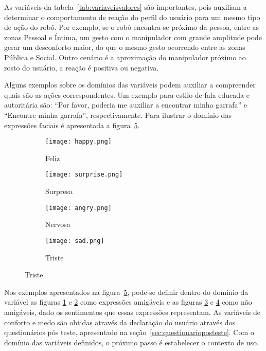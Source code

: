 As variáveis da tabela~\ref{tab:variaveisvalores} são importantes, pois auxiliam a determinar o comportamento de reação do perfil do usuário para um mesmo tipo de ação do robô. Por exemplo, se o robô encontra-se próximo da pessoa, entre as zonas Pessoal e Íntima, um gesto com o manipulador com grande amplitude pode gerar um desconforto maior, do que o mesmo gesto ocorrendo entre as zonas Pública e Social. Outro cenário é a aproximação do manipulador próximo ao rosto do usuário, a reação é positiva ou negativa.

Alguns exemplos sobre os domínios das variáveis podem auxiliar a compreender quais são as ações correspondentes. Um exemplo para estilo de fala educada e autoritária são: ``Por favor, poderia me auxiliar a encontrar minha garrafa'' e ``Encontre minha garrafa'', respectivamente. Para ilustrar o domínio das expressões faciais é apresentada a figura~\ref{fig:dominioexpressoesfaciais}.

\begin{figure}[ht!]
	\centering
	\begin{minipage}{\textwidth}
		\caption{Exemplos das faces apresentadas pelo robô.}
		\begin{subfigure}[b]{0.48\textwidth}
			\texttt{[image: happy.png]}
	        \caption{Feliz}
	        \label{fig:feliz}
	    \end{subfigure}
	    \hfill
		\begin{subfigure}[b]{0.48\textwidth}
	        \texttt{[image: surprise.png]}
	        \caption{Surpresa}
	        \label{fig:surpresa}
	    \end{subfigure}

		\begin{subfigure}[b]{0.48\textwidth}
	        \texttt{[image: angry.png]}
	        \caption{Nervosa}
	        \label{fig:nervosa}
    	\end{subfigure}
		\hfill
		\begin{subfigure}[b]{0.48\textwidth}
	        \texttt{[image: sad.png]}
	        \caption{Triste}
	        \label{fig:triste}
    	\end{subfigure}
		\label{fig:dominioexpressoesfaciais}
	\end{minipage}
\end{figure}

Nos exemplos apresentados na figura~\ref{fig:dominioexpressoesfaciais}, pode-se definir dentro do domínio da variável as figuras \ref{fig:feliz} e \ref{fig:surpresa} como expressões amigáveis e as figuras \ref{fig:nervosa} e \ref{fig:triste} como não amigáveis, dado os sentimentos que essas expressões representam. As variáveis de conforto e medo são obtidas através da declaração do usuário através dos questionários pós teste, apresentado na seção~\ref{sec:questionarioposteste}. Com o domínio das variáveis definidos, o próximo passo é estabelecer o contexto de uso.

